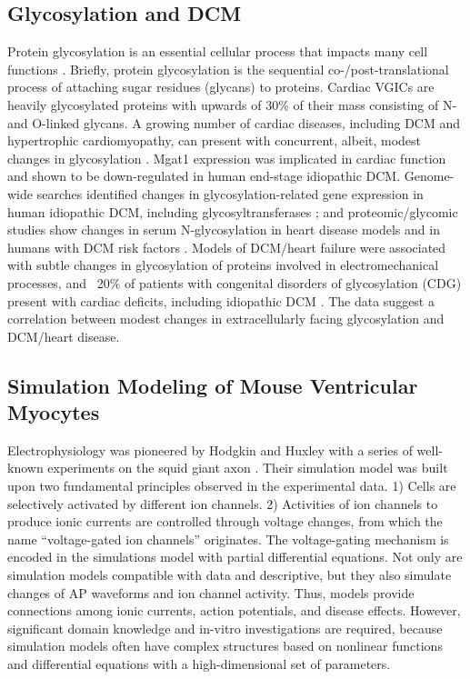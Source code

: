 \documentclass[journal]{IEEEtran}
\begin{document}
\subsection{Glycosylation and DCM}
Protein glycosylation is an essential cellular process that impacts many cell functions \cite{marques2017cardiac}. Briefly, protein glycosylation is the sequential co-/post-translational process of attaching sugar residues (glycans) to proteins. Cardiac VGICs are heavily glycosylated proteins with upwards of 30\% of their mass consisting of N- and O-linked glycans. A growing number of cardiac diseases, including DCM and hypertrophic cardiomyopathy, can present with concurrent, albeit, modest changes in glycosylation \cite{gehrmann2003cardiomyopathy, footitt2009cardiomyopathy, marques2017cardiac}. Mgat1 expression was implicated in cardiac function and shown to be down-regulated in human end-stage idiopathic DCM. Genome-wide searches identified changes in glycosylation-related gene expression in human idiopathic DCM, including glycosyltransferases \cite{barrans2002global, hwang2002microarray, yung2004gene}; and proteomic/glycomic studies show changes in serum N-glycosylation in heart disease models and in humans with DCM risk factors \cite{nishio1995identification, knezevic2009variability, miura2016glycomics, nagai2016aberrant, yang2015glycoproteins}. Models of DCM/heart failure were associated with subtle changes in glycosylation of proteins involved in electromechanical processes, and ~20\% of patients with congenital disorders of glycosylation (CDG) present with cardiac deficits, including idiopathic DCM \cite{gehrmann2003cardiomyopathy, marques2017cardiac}. The data suggest a correlation between modest changes in extracellularly facing glycosylation and DCM/heart disease. 

\subsection{Simulation Modeling of Mouse Ventricular Myocytes}
Electrophysiology was pioneered by Hodgkin and Huxley with a series of well-known experiments on the squid giant axon \cite{hodgkin1952quantitative}. Their simulation model was built upon two fundamental principles observed in the experimental data. 1) Cells are selectively activated by different ion channels. 2) Activities of ion channels to produce ionic currents are controlled through voltage changes, from which the name ``voltage-gated ion channels'' originates. The voltage-gating mechanism is encoded in the simulations model with partial differential equations. Not only are simulation models compatible with data and descriptive, but they also simulate changes of AP waveforms and ion channel activity. Thus, models provide connections among ionic currents, action potentials, and disease effects. However, significant domain knowledge and in-vitro investigations are required, because simulation models often have complex structures based on nonlinear functions and differential equations with a high-dimensional set of parameters.
\end{document}
